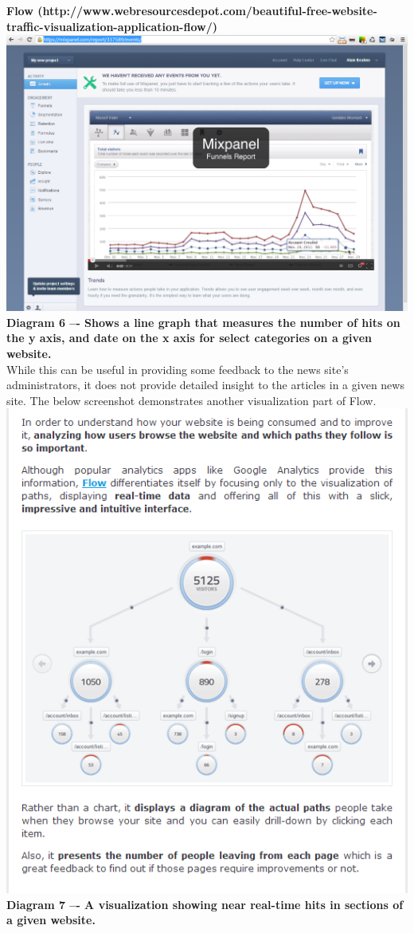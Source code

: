 \documentclass[12pt]{article}
\begin{document}
\noindent\textbf{Flow (http://www.webresourcesdepot.com/beautiful-free-website-traffic-visualization-application-flow/)} \\
\noindent\includegraphics[scale=0.45]{img/flow}
\noindent\textbf{Diagram 6 –- Shows a line graph that measures the number of hits on the y axis, and date on the x axis for select categories on a given website.} \\

While this can be useful in providing some feedback to the news site’s administrators, it does not provide detailed insight to the articles in a given news site. The below screenshot demonstrates another visualization part of Flow. \\
\noindent\includegraphics[scale=1]{img/flow1}
\noindent\textbf{Diagram 7 –- A visualization showing near real-time hits in sections of a given website.} \\
\end{document}
